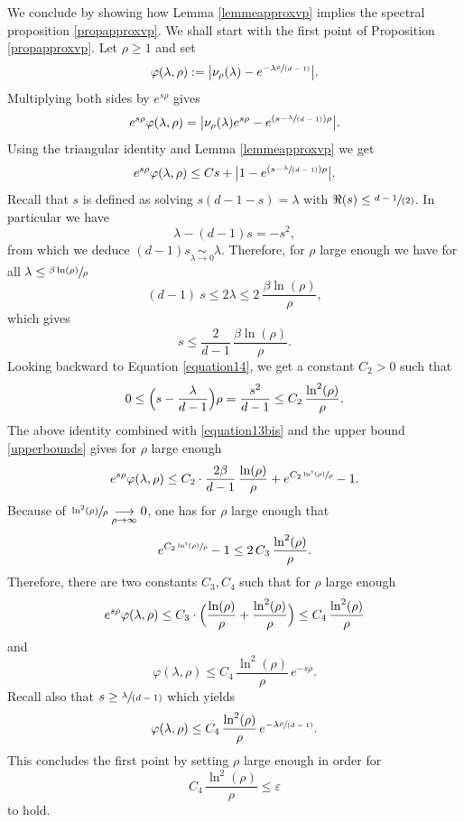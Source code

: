 \documentclass[JEP,XML,SOM,Unicode,NoFloatCountersInSection,published]{cedram}
\let\epsilon\varepsilon
\newcommand{\spfrac}[2]{\sfrac{#1}{(#2)}}
\theoremstyle{plain}
\theoremstyle{definition}
\newcommand{\tends}[1]{\underset{#1}{\longrightarrow}}
\newcommand{\equivaut}[1]{\underset{#1}{\sim}}
\begin{document}
We conclude by showing how Lemma \ref{lemmeapproxvp} implies the spectral proposition \ref{propapproxvp}. We shall start with the first point of Proposition \ref{propapproxvp}. Let $\rho \ge 1$ and set
\[
\varphi(\lambda,\rho) := \bigl| \nu_{\rho}(\lambda) - e^{-\lambda \spfrac{\rho}{d-1}}\bigr|.
\]
Multiplying both sides by $e^{s \rho}$ gives
\[
e^{s \rho} \varphi(\lambda,\rho) = \bigl| \nu_{\rho}(\lambda)e^{s\rho} - e^{\left(s - \spfrac{\lambda}{d-1} \right) \rho}\bigr|.
\]
Using the triangular identity and Lemma \ref{lemmeapproxvp} we get
\begin{equation}
\label{equation13bis}
e^{s \rho} \varphi(\lambda,\rho) \le C s + \bigl| 1 - e^{\left(s - \spfrac{\lambda}{d-1} \right) \rho} \bigr|.
\end{equation}
Recall that $s$ is defined as solving $s(d-1 -s) = \lambda$ with $\Re(s) \le \spfrac{d-1}{2}$. In particular we have
\begin{equation}
\label{equation14}
\lambda - (d-1)s = -s^2,
\end{equation}
from which we deduce $(d-1)s \equivaut{\lambda \to 0} \lambda$. Therefore, for $\rho$ large enough we have for all $\lambda \le \sfrac{\beta \ln(\rho) }{\rho}$
\[
(d-1) \ s \le 2 \lambda \le 2 \ \frac{\beta \ln (\rho)}{\rho},
\]
which gives
\begin{equation}
\label{upperbounds}
s \le \frac{2}{d-1}\, \frac{\beta \ln(\rho)}{\rho}.
\end{equation}
Looking backward to Equation \eqref{equation14}, we get a constant $C_2 > 0$ such that
\begin{equation*}
0 \le \Bigl(s - \frac{\lambda}{d-1} \Bigr) \rho = \frac{s^2}{d-1} \le C_2\, \frac{ \ln^2(\rho)}{\rho}.
\end{equation*}
The above identity combined with \eqref{equation13bis} and the upper bound \eqref{upperbounds} gives for $\rho$ large enough
\[
e^{s \rho} \varphi(\lambda,\rho) \le C_2 \cdot \frac{2 \beta}{d-1}\, \frac{\ln(\rho)}{\rho} + e^{ C_2 \sfrac{ \ln^2(\rho)}{\rho}} -1.
\]
Because of $\sfrac{\ln^2(\rho)}{\rho} \tends{\rho \to \infty} 0$, one has for $\rho$ large enough that
\[
e^{ C_2 \sfrac{ \ln^2(\rho)}{\rho}} -1 \le 2 \, C_3 \, \frac{\ln^2(\rho)}{\rho}.
\]
Therefore, there are two constants $C_3, C_4$ such that for $\rho$ large enough
\[
e^{s \rho} \varphi(\lambda,\rho) \le C_3 \cdot \Bigl(\frac{\ln(\rho)}{\rho} + \frac{ \ln^2(\rho)}{\rho} \Bigr) \le C_4\, \frac{ \ln^2(\rho)}{\rho}
\]
and
\[
\varphi(\lambda,\rho) \le C_4\, \frac{ \ln^2(\rho)}{\rho} \, e^{- s \rho}.
\]
Recall also that $ s \ge \spfrac{\lambda}{d-1}$ which yields
\[
\varphi(\lambda,\rho) \le C_4\, \frac{ \ln^2(\rho)}{\rho}\, e^{ - \lambda \spfrac{\rho}{d-1}}.
\]
This concludes the first point by setting $\rho$ large enough in order for
\[
C_4\, \frac{ \ln^2(\rho)}{\rho} \le \epsilon
\]
to hold.
\end{document}

